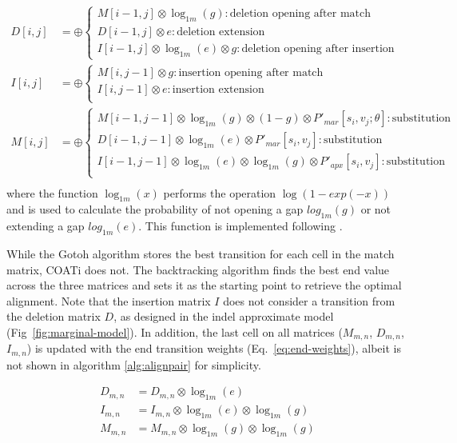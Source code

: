 \begingroup
\allowdisplaybreaks    
\begin{align*}
    D[i,j] &= \oplus \begin{cases}
        M[i-1, j] \otimes \log_{1m}(g): \text{deletion opening after match}\\
        D[i-1, j] \otimes e: \text{deletion extension}\\
        I[i-1, j] \otimes \log_{1m}(e) \otimes g: \text{deletion opening after insertion}
    \end{cases}\\
    I[i,j] &= \oplus \begin{cases}
        M[i ,j-1] \otimes g: \text{insertion opening after match}\\
        I[i, j-1] \otimes e: \text{insertion extension}\\
    \end{cases}\\
    M[i,j] &= \oplus \begin{cases}
        M[i-1, j-1] \otimes \log_{1m}(g) \otimes (1-g) \otimes P'_{mar}[s_i, v_j; \theta]: \text{substitution}\\
        D[i-1, j-1] \otimes \log_{1m}(e) \otimes P'_{mar}[s_i, v_j]: \text{substitution}\\
        I[i-1, j-1] \otimes \log_{1m}(e) \otimes \log_{1m}(g) \otimes P'_{apx}[s_i, v_j]: \text{substitution}\\
    \end{cases}\\
\end{align*}
\endgroup
where the function $\log_{1m}(x)$ performs the operation $\log(1-exp(-x))$ and is used to calculate the probability of not opening a gap $log_{1m}(g)$ or not extending a gap $log_{1m}(e)$. This function is implemented following \citep{machler2012log1m}.

While the Gotoh algorithm stores the best transition for each cell in the match matrix, COATi does not. The backtracking algorithm finds the best end value across the three matrices and sets it as the starting point to retrieve the optimal alignment. Note that the insertion matrix $I$ does not consider a transition from the deletion matrix $D$, as designed in the indel approximate model (Fig~\ref{fig:marginal-model}). In addition, the last cell on all matrices ($M_{m,n}$, $D_{m,n}$, $I_{m,n}$) is updated with the end transition weights (Eq.~\ref{eq:end-weights}), albeit is not shown in algorithm \ref{alg:alignpair} for simplicity.

\begin{equation} \label{eq:end-weights}
\begin{split}
    D_{m,n} &= D_{m,n} \otimes \log_{1m}(e)\\
    I_{m,n} &= I_{m,n} \otimes \log_{1m}(e) \otimes \log_{1m}(g)\\
    M_{m,n} &= M_{m,n} \otimes \log_{1m}(g) \otimes \log_{1m}(g)\\
\end{split}
\end{equation}

